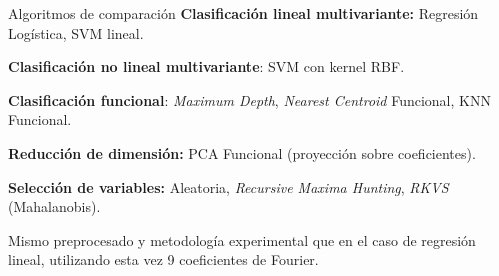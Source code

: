 \documentclass[10pt, english, professionalfonts]{beamer}
\begin{document}
\begin{frame}{Algoritmos de comparación}
  \textbf{Clasificación lineal multivariante:} Regresión Logística, SVM lineal.

  \textbf{Clasificación no lineal multivariante}: SVM con kernel RBF.

  \textbf{Clasificación funcional}: \textit{Maximum Depth}, \textit{Nearest Centroid} Funcional, KNN Funcional.

  \textbf{Reducción de dimensión:} PCA Funcional (proyección sobre coeficientes).

  \textbf{Selección de variables:} Aleatoria, \textit{Recursive Maxima Hunting}, \textit{RKVS} (Mahalanobis).

  \vspace{1em}

  Mismo preprocesado y metodología experimental que en el caso de regresión lineal, utilizando esta vez 9 coeficientes de Fourier.
\end{frame}
\end{document}
